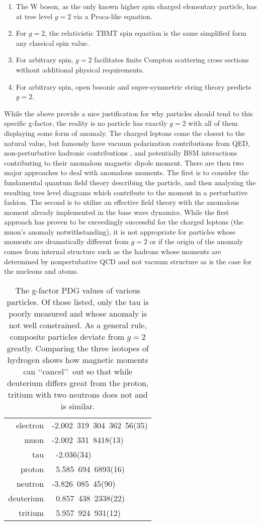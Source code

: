 \begin{enumerate}
	\item The W boson, as the only known higher spin charged elementary particle, has at tree level $g=2$ via a Proca-like equation.
	\item For $g=2$, the relativistic TBMT spin equation is the same simplified form any classical spin value.
	\item For arbitrary spin, $g=2$ facilitates finite Compton scattering cross sections without additional physical requirements.
	\item For arbitrary spin, open bosonic and super-symmetric string theory predicts $g=2$.
\end{enumerate}
While the above provide a nice justification for why particles should tend to this specific g-factor, the reality is no particle has exactly $g=2$ with all of them displaying some form of anomaly. The charged leptons come the closest to the natural value, but famously have vacuum polarization contributions \cite{Schwinger:1951nm} from QED, non-perturbative hadronic contributions \cite{Jegerlehner:2001wq,Jegerlehner:2017gek}, and potentially BSM interactions \cite{Czarnecki:2001pv,Knecht:2004,Jegerlehner:2009ry} contributing to their anomalous magnetic dipole moment. There are then two major approaches to deal with anomalous moments. The first is to consider the fundamental quantum field theory describing the particle, and then analyzing the resulting tree level diagrams which contribute to the moment in a perturbative fashion. The second is to utilize an effective field theory with the anomalous moment already implemented in the base wave dynamics. While the first approach has proven to be exceedingly successful for the charged leptons (the muon's anomaly notwithstanding), it is not appropriate for particles whose moments are dramatically different from $g=2$ or if the origin of the anomaly comes from internal structure such as the hadrons whose moments are determined by nonpertubative QCD \cite{Eichmann:2016yit,Pacetti:2014jai} and not vacuum structure as is the case for the nucleons and atoms.

\begin{table}
	\centering
\begin{tabular}{|r|l|}
	electron & -2.002\ 319\ 304\ 362\ 56(35)\\
	muon & -2.002\ 331\ 8418(13)\\
	tau & \ -2.036(34)\\
	proton & \ 5.585\ 694\ 6893(16)\\
	neutron & -3.826\ 085\ 45(90)\\
	deuterium & \ 0.857\ 438\ 2338(22)\\
	tritium & \ 5.957\ 924\ 931(12)
\end{tabular}
	\caption{The g-factor PDG values of various particles. Of those listed, only the tau is poorly measured and whose anomaly is not well constrained. As a general rule, composite particles deviate from $g=2$ greatly. Comparing the three isotopes of hydrogen shows how magnetic moments can \lq\lq cancel\rq\rq\ out so that while deuterium differs great from the proton, tritium with two neutrons does not and is similar.}
	\label{ajs:table:01}
\end{table}

